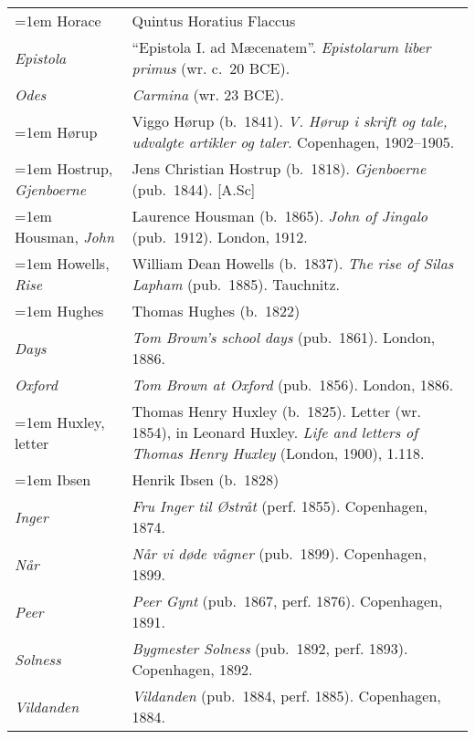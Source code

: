 \begin{xltabular}{\textwidth}{ lQ }
\hangindent=1em  Horace & Quintus Horatius Flaccus \\
\hspace{1em}\textit{Epistola} & ``Epistola I. ad Mæcenatem''. \textit{Epistolarum liber primus} (wr. c.~20 BCE).\\
\hspace{1em}\textit{Odes} & \textit{Carmina} (wr. 23 BCE).\\

\hangindent=1em  Hørup & Viggo Hørup (b.~1841). \textit{V. Hørup i skrift og tale, udvalgte artikler og taler}. Copenhagen, 1902--1905. \\

\hangindent=1em  Hostrup, \textit{Gjenboerne} & Jens Christian Hostrup (b.~1818). \textit{Gjenboerne} (pub.~1844). [A.Sc] \\

\hangindent=1em  Housman, \textit{John} & Laurence Housman (b.~1865). \textit{John of Jingalo} (pub.~1912). London, 1912. \\

\hangindent=1em  Howells, \textit{Rise} & William Dean Howells (b.~1837). \textit{The rise of Silas Lapham} (pub.~1885). Tauchnitz. \\

\pagebreak
\hangindent=1em  Hughes & Thomas Hughes (b.~1822)\\
\hspace{1em}\textit{Days} & \textit{Tom Brown's school days} (pub.~1861). London, 1886. \\ %
\hspace{1em}\textit{Oxford} & \textit{Tom Brown at Oxford} (pub.~1856). London, 1886. \\ %

\hangindent=1em  Huxley, letter & Thomas Henry Huxley (b.~1825). Letter (wr. 1854), in Leonard Huxley. \textit{Life and letters of Thomas Henry Huxley} (London, 1900), 1.118.\\

\hangindent=1em  Ibsen & Henrik Ibsen (b.~1828) \\
\hspace{1em}\textit{Inger} & \textit{Fru Inger til Østråt} (perf. 1855). Copenhagen, 1874. \\
\hspace{1em}\textit{Når} & \textit{Når vi døde vågner} (pub.~1899). Copenhagen, 1899. \\
\hspace{1em}\textit{Peer} & \textit{Peer Gynt} (pub.~1867, perf. 1876). Copenhagen, 1891. \\
\hspace{1em}\textit{Solness} & \textit{Bygmester Solness} (pub.~1892, perf. 1893). Copenhagen, 1892. \\
\hspace{1em}\textit{Vildanden} & \textit{Vildanden} (pub.~1884, perf. 1885). Copenhagen, 1884. \\


\end{xltabular}
